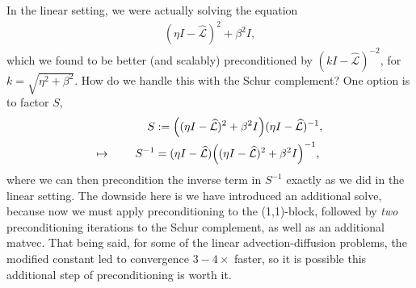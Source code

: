\documentclass[a4paper,10pt]{article}
\begin{document}
In the linear setting, we were actually solving the equation
%
\begin{align*}
(\eta I - \widehat{\mathcal{L}})^2 + \beta^2 I,
\end{align*}
%
which we found to be better (and scalably) preconditioned by $(k I - \widehat{\mathcal{L}})^{-2}$,
for $k = \sqrt{\eta^2+\beta^2}$. How do we handle this with the Schur complement? One
option is to factor $S$,
%
\begin{align*}
S & := \Big((\eta I - \widehat{\mathcal{L}})^2 + \beta^2I\Big)(\eta I - \widehat{\mathcal{L}})^{-1}, \\
\mapsto\hspace{5ex}
S^{-1} & = (\eta I - \widehat{\mathcal{L}})\Big((\eta I - \widehat{\mathcal{L}})^2 + \beta^2I\Big)^{-1},
\end{align*}
%
where we can then precondition the inverse term in $S^{-1}$ exactly as we did in the
linear setting. The downside here is we have introduced an additional solve, because
now we must apply preconditioning to the (1,1)-block, followed by \textit{two}
preconditioning iterations to the Schur complement, as well as an additional matvec.
That being said, for some of the linear advection-diffusion problems, the modified
constant led to convergence $3-4\times$ faster, so it is possible this additional
step of preconditioning is worth it. 
\end{document}
